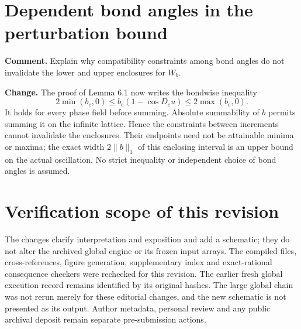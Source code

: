 \documentclass[10pt]{article}
\newcommand{\nrm}[1]{\lVert#1\rVert}
\begin{document}
\section{Dependent bond angles in the perturbation bound}

\textbf{Comment.} Explain why compatibility constraints among bond angles
do not invalidate the lower and upper enclosures for $W_b$.

\textbf{Change.} The proof of Lemma 6.1 now writes the bondwise inequality
\[
 2\min(b_e,0)\le b_e(1-\cos D_eu)\le2\max(b_e,0).
\]
It holds for every phase field before summing. Absolute summability of
$b$ permits summing it on the infinite lattice. Hence the constraints
between increments cannot invalidate the enclosures. Their endpoints
need not be attainable minima or maxima; the exact width $2\nrm b_1$
of this enclosing interval is an upper bound on the actual oscillation.
No strict inequality or independent choice of bond angles is assumed.

\section*{Verification scope of this revision}

The changes clarify interpretation and exposition and add a schematic;
they do not alter the archived global engine or its frozen input arrays.
The compiled files, cross-references, figure generation, supplementary
index and exact-rational consequence checkers were rechecked for this
revision. The earlier fresh global execution record remains identified
by its original hashes. The large global chain was not rerun merely for
these editorial changes, and the new schematic is not presented as its
output. Author metadata, personal review and any public archival deposit
remain separate pre-submission actions.
\end{document}
